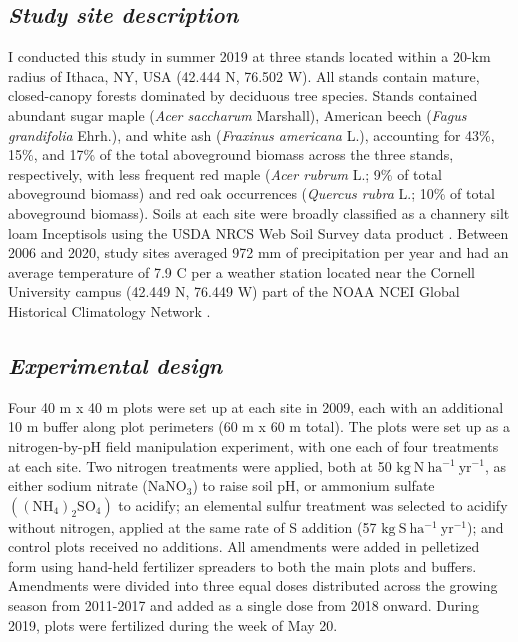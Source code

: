 \subsection{\textit{Study site description}}
\noindent I conducted this study in summer 2019 at three stands located within a 20-km radius of Ithaca, NY, USA (42.444 \textdegree{}N, 76.502 \textdegree{}W). All stands contain mature, closed-canopy forests dominated by deciduous tree species. Stands contained abundant sugar maple (\textit{Acer saccharum} Marshall), American beech (\textit{Fagus grandifolia} Ehrh.), and white ash (\textit{Fraxinus americana} L.), accounting for 43\%, 15\%, and 17\% of the total aboveground biomass across the three stands, respectively, with less frequent red maple (\textit{Acer rubrum} L.; 9\% of total aboveground biomass) and red oak occurrences (\textit{Quercus rubra} L.; 10\% of total aboveground biomass). Soils at each site were broadly classified as a channery silt loam Inceptisols using the USDA NRCS Web Soil Survey data product . Between 2006 and 2020, study sites averaged 972 mm of precipitation per year and had an average temperature of 7.9 \textdegree{}C per a weather station located near the Cornell University campus (42.449 \textdegree{}N, 76.449 \textdegree{}W) part of the NOAA NCEI Global Historical Climatology Network .


\subsection{\textit{Experimental design}}
\noindent Four 40 m x 40 m plots were set up at each site in 2009, each with an additional 10 m buffer along plot perimeters (60 m x 60 m total). The plots were set up as a nitrogen-by-pH field manipulation experiment, with one each of four treatments at each site. Two nitrogen treatments were applied, both at 50 $\mathrm{kg\ N\ ha^{-1}\ yr^{-1}}$, as either sodium nitrate ($\mathrm{NaNO_3}$) to raise soil pH, or ammonium sulfate $\mathrm{((NH_4)_{2}SO_4)}$ to acidify; an elemental sulfur treatment was selected to acidify without nitrogen, applied at the same rate of S addition (57 $\mathrm{kg\ S\ ha^{-1}\ yr^{-1}}$); and control plots received no additions. All amendments were added in pelletized form using hand-held fertilizer spreaders to both the main plots and buffers. Amendments were divided into three equal doses distributed across the growing season from 2011-2017 and added as a single dose from 2018 onward. During 2019, plots were fertilized during the week of May 20.

